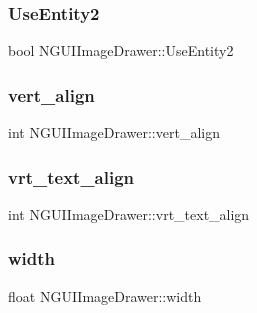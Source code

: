 \subsubsection{\texorpdfstring{Use\+Entity2}{UseEntity2}}
{\footnotesize\ttfamily bool N\+G\+U\+I\+Image\+Drawer\+::\+Use\+Entity2}

\hypertarget{class_n_g_u_i_image_drawer_aac956b8c4566f9f28a486bbadcc85019}{}\label{class_n_g_u_i_image_drawer_aac956b8c4566f9f28a486bbadcc85019} 
\subsubsection{\texorpdfstring{vert\+\_\+align}{vert\_align}}
{\footnotesize\ttfamily int N\+G\+U\+I\+Image\+Drawer\+::vert\+\_\+align}

\hypertarget{class_n_g_u_i_image_drawer_a40a0d72cd0b253fe7d1b98c9fef66090}{}\label{class_n_g_u_i_image_drawer_a40a0d72cd0b253fe7d1b98c9fef66090} 
\subsubsection{\texorpdfstring{vrt\+\_\+text\+\_\+align}{vrt\_text\_align}}
{\footnotesize\ttfamily int N\+G\+U\+I\+Image\+Drawer\+::vrt\+\_\+text\+\_\+align}

\hypertarget{class_n_g_u_i_image_drawer_ac1537f32a87c42b49840b366cbdac8ad}{}\label{class_n_g_u_i_image_drawer_ac1537f32a87c42b49840b366cbdac8ad} 
\subsubsection{\texorpdfstring{width}{width}}
{\footnotesize\ttfamily float N\+G\+U\+I\+Image\+Drawer\+::width}

\hypertarget{class_n_g_u_i_image_drawer_aa45630eba96d13500694a5a1372f8759}{}\label{class_n_g_u_i_image_drawer_aa45630eba96d13500694a5a1372f8759} 

